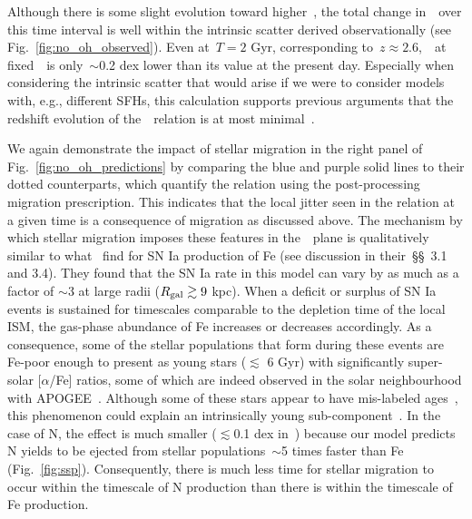 \documentclass[ms.tex]{subfiles}
\begin{document}
Although there is some slight evolution toward higher~\no, the total change
in~\no~over this time interval is well within the intrinsic scatter derived
observationally (see Fig.~\ref{fig:no_oh_observed}).
Even at~$T = 2$ Gyr, corresponding to~$z \approx 2.6$,~\no~at fixed~\oh~is
only~$\sim$0.2 dex lower than its value at the present day.
Especially when considering the intrinsic scatter that would arise if we were
to consider models with, e.g., different SFHs, this calculation supports
previous arguments that the redshift evolution of the~\ohno~relation is at most
minimal~\citep{Vincenzo2018, HaydenPawson2021}.
\par
We again demonstrate the impact of stellar migration in the right panel of
Fig.~\ref{fig:no_oh_predictions} by comparing the blue and purple solid lines
to their dotted counterparts, which quantify the relation using the
post-processing migration prescription.
This indicates that the local jitter seen in the relation at a given time is
a consequence of migration as discussed above.
The mechanism by which stellar migration imposes these features in
the~\ohno~plane is qualitatively similar to what~\citet{Johnson2021} find for
SN Ia production of Fe (see discussion in their~\S\S~3.1 and 3.4).
They found that the SN Ia rate in this model can vary by as much as a factor of
$\sim$3 at large radii ($R_\text{gal} \gtrsim 9$ kpc).
When a deficit or surplus of SN Ia events is sustained for timescales
comparable to the depletion time of the local ISM, the gas-phase abundance of
Fe increases or decreases accordingly.
As a consequence, some of the stellar populations that form during these
events are Fe-poor enough to present as young stars ($\lesssim$ 6 Gyr) with
significantly super-solar [$\alpha$/Fe] ratios, some of which are indeed
observed in the solar neighbourhood with APOGEE~\citep{Chiappini2015,
Martig2015, Martig2016, Warfield2021}.
Although some of these stars appear to have mis-labeled ages~\citep{Jofre2016,
Yong2016, Izzard2018, SilvaAguirre2018, Miglio2021}, this phenomenon could
explain an intrinsically young sub-component~\citep{Hekker2019}.
In the case of N, the effect is much smaller ($\lesssim$0.1 dex in~\no) because
our model predicts N yields to be ejected from stellar populations~$\sim$5
times faster than Fe (Fig.~\ref{fig:ssp}).
Consequently, there is much less time for stellar migration to occur within
the timescale of N production than there is within the timescale of Fe
production.
\end{document}
